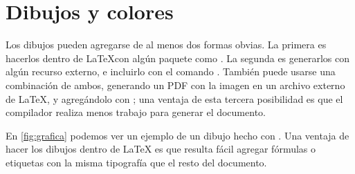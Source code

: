 \section{Dibujos y colores}
\label{sec:dibujos}

Los dibujos pueden agregarse de al menos dos formas obvias.   La primera es
hacerlos dentro de \LaTeX con alg\'un paquete como
\href{https://github.com/pgf-tikz/pgf}{}.   La segunda es
generarlos con alg\'un recurso externo, e incluirlo con el comando
.   Tambi\'en puede usarse una
combinaci\'on de ambos, generando un PDF con la imagen en un archivo externo de
\LaTeX, y agreg\'andolo con ; una ventaja
de esta tercera posibilidad es que el compilador realiza menos trabajo para
generar el documento.

En \cref{fig:grafica} podemos ver un ejemplo de un dibujo hecho con .
Una ventaja de hacer los dibujos dentro de \LaTeX{} es que resulta f\'acil
agregar f\'ormulas o etiquetas con la misma tipograf\'ia que el resto del
documento.

